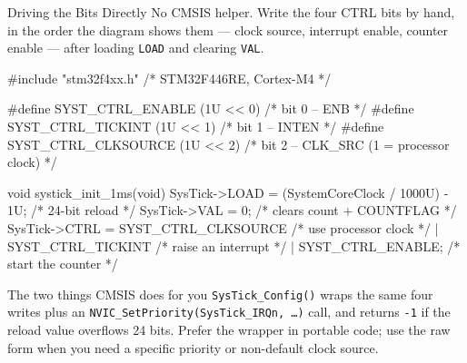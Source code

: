 \documentclass[9pt,aspectratio=169,xcolor=table]{beamer}
\begin{document}
{\beamerextras
\begin{frame}[fragile]{Driving the Bits Directly}
    \leavevmode
    {\small No CMSIS helper. Write the four CTRL bits by hand, in the order
    the diagram shows them --- clock source, interrupt enable, counter
    enable --- after loading \texttt{LOAD} and clearing \texttt{VAL}.}

    \vspace{2mm}
\begin{cc}[basicstyle=\ttfamily\footnotesize]
#include "stm32f4xx.h"                 /* STM32F446RE, Cortex-M4 */

#define SYST_CTRL_ENABLE     (1U << 0) /* bit 0  -- ENB */
#define SYST_CTRL_TICKINT    (1U << 1) /* bit 1  -- INTEN */
#define SYST_CTRL_CLKSOURCE  (1U << 2) /* bit 2  -- CLK_SRC (1 = processor clock) */

void systick_init_1ms(void) {
    SysTick->LOAD = (SystemCoreClock / 1000U) - 1U;   /* 24-bit reload */
    SysTick->VAL  = 0;                                /* clears count + COUNTFLAG */
    SysTick->CTRL = SYST_CTRL_CLKSOURCE               /* use processor clock */
                  | SYST_CTRL_TICKINT                 /* raise an interrupt  */
                  | SYST_CTRL_ENABLE;                 /* start the counter   */
}
\end{cc}

    \vspace{2mm}
    \begin{block}{The two things CMSIS does for you}
        {\small \texttt{SysTick\_Config()} wraps the same four writes
        \alert{plus} an \texttt{NVIC\_SetPriority(SysTick\_IRQn, \ldots)}
        call, and returns \texttt{-1} if the reload value overflows 24
        bits. Prefer the wrapper in portable code; use the raw form when
        you need a specific priority or non-default clock source.}
    \end{block}
\end{frame}
}
\end{document}
